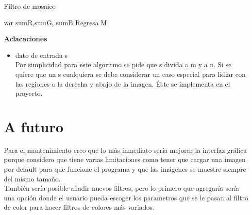 \documentclass[11pt]{article}
\begin{document}
\begin{algorithm}[H] %
\caption{Filtro de mosaico}
\label{ML:Algorithm1}
\SetAlgoLined
{}
\LinesNumbered
\SetAlgoVlined
var sumR,sumG, sumB\;
Regresa M\;
\end{algorithm}

\vspace{20px}
\textbf{Aclacaciones}
\begin{itemize}
\item dato de entrada s \\

  Por simplicidad para este algoritmo se pide que s divida a m y a
  n. Si se quiere que un s cualquiera se debe considerar un caso
  especial para lidiar con las regiones a la derecha y abajo de la
  imagen. Éste se implementa en el proyecto. \\

\end{itemize}

\section{A futuro}
Para el mantenimiento creo que lo más inmediato sería mejorar la
interfaz gráfica porque considero que tiene varias limitaciones como
tener que cargar una imagen por default para que funcione el programa
y que las imágenes se muestre siempre del mismo tamaño.\\

También sería posible añadir nuevos filtros, pero lo primero que agregaría sería una opción donde el usuario pueda escoger los parametros que se le pasan al filtro de color para hacer filtros de colores más variados.\\
\end{document}
